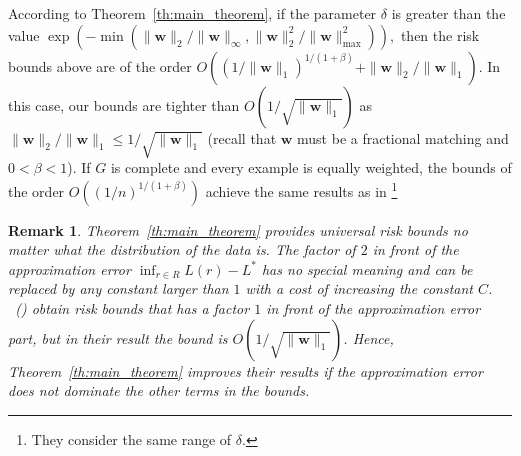 \documentclass[letterpaper]{article} %
\newtheorem{remark}{Remark}
\newtheorem*{remark*}{Remark}
\newcommand{\weight}{\mathbf{w}}
\newcommand{\bayeserror}{L^*}
\newcommand{\risk}{L}
\newcommand{\normo}[1]{\|#1\|_1}
\newcommand{\complexbound}{\beta}
\newcommand{\citet}[1]{\citeauthor{#1}\ (\citeyear{#1})}
\begin{document}
According to Theorem~\ref{th:main_theorem}, if the parameter 
$\delta$ is greater than the value $\exp\left(-\min(\|\weight{}\|_2/\|\weight{}\|_\infty,\|\weight{}\|_2^2/\|\weight{}\|_\max^2)\right),$ 
then the risk bounds above are of the order
$O\left((1/\normo{\weight{}})^{1/(1+\complexbound)}+\|\weight{}\|_2/\normo{\weight{}}\right).$ 
In this case, our bounds are tighter than $O(1/\sqrt{\normo{\weight{}}})$ as $\|\weight\|_2/\normo{\weight}\le 1/\sqrt{\normo{\weight}}$ (recall that $\weight{}$ must be a fractional matching and $0<\complexbound{}<1$).
If $G$ is complete and every example is equally weighted, 
the bounds of the order $O((1/n)^{1/(1+\complexbound)})$ achieve the same results as in \cite{papa2016graph}\footnote{They consider the same range of $\delta$.} %

\begin{remark*}
Theorem~\ref{th:main_theorem} provides universal risk bounds no matter what the distribution of the data is. The factor of $2$ in front of the approximation error $\inf_{r\in R}\risk(r)-\bayeserror$ has no special meaning and can be replaced by any constant larger than $1$ with a cost of increasing the constant $C$. 
\citet{wang2017learning} obtain risk bounds that has a factor $1$ in front of the approximation error part, but in their result the bound is $O(1/\sqrt{\normo{\weight{}}})$. 
Hence, Theorem~\ref{th:main_theorem} improves their results if the approximation error does not dominate the other terms in the bounds.
\end{remark*}

\end{document}
